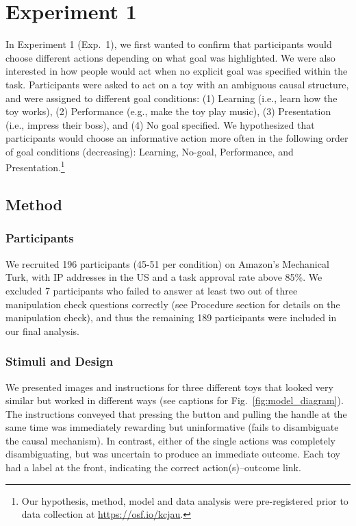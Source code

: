 \documentclass[10pt, letterpaper]{article}
\begin{document}
\section{Experiment 1}\label{experiment-1}

In Experiment 1 (Exp.~1), we first wanted to confirm that participants
would choose different actions depending on what goal was highlighted.
We were also interested in how people would act when no explicit goal
was specified within the task. Participants were asked to act on a toy
with an ambiguous causal structure, and were assigned to different goal
conditions: (1) Learning (i.e., learn how the toy works), (2)
Performance (e.g., make the toy play music), (3) Presentation (i.e.,
impress their boss), and (4) No goal specified. We hypothesized that
participants would choose an informative action more often in the
following order of goal conditions (decreasing): Learning, No-goal,
Performance, and
Presentation.\footnote{Our hypothesis, method, model and data analysis were pre-registered prior to data collection at \url{https://osf.io/kcjau}.}

\subsection{Method}\label{method}

\subsubsection{Participants}\label{participants}

We recruited 196 participants (45-51 per condition) on Amazon's
Mechanical Turk, with IP addresses in the US and a task approval rate
above 85\%. We excluded 7 participants who failed to answer at least two
out of three manipulation check questions correctly (see Procedure
section for details on the manipulation check), and thus the remaining
189 participants were included in our final analysis.

\subsubsection{Stimuli and Design}\label{stimuli-and-design}

We presented images and instructions for three different toys that
looked very similar but worked in different ways (see captions for
Fig.~\ref{fig:model_diagram}). The instructions conveyed that pressing
the button and pulling the handle at the same time was immediately
rewarding but uninformative (fails to disambiguate the causal
mechanism). In contrast, either of the single actions was completely
disambiguating, but was uncertain to produce an immediate outcome. Each
toy had a label at the front, indicating the correct action(s)--outcome
link.
\end{document}
